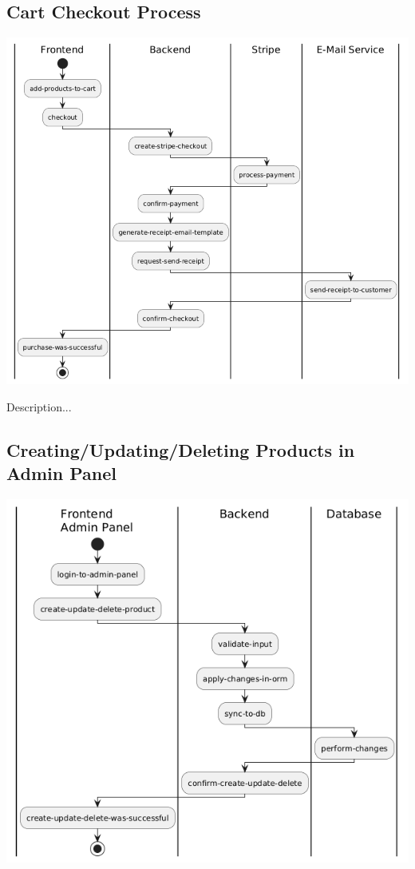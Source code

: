 \hypertarget{__runtime_scenario_2}{%
\subsection{Cart Checkout Process}\label{__runtime_scenario_2}}
\includegraphics{images/uml_swimlane_checkout.png}

Description...

\hypertarget{__runtime_scenario_3}{%
\subsection{Creating/Updating/Deleting Products in Admin Panel}\label{__runtime_scenario_3}}
\includegraphics{images/uml_swimlane_product_create_update_delete.png}

